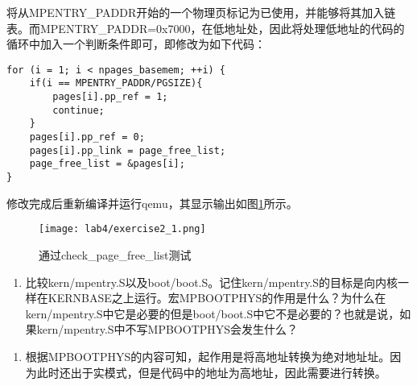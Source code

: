 \begin{exerciseSolution}{2}
    \par 将从MPENTRY\_PADDR开始的一个物理页标记为已使用，并能够将其加入链表。而MPENTRY\_PADDR=0x7000，在低地址处，因此将处理低地址的代码的循环中加入一个判断条件即可，即修改为如下代码：
    \begin{lstlisting}
for (i = 1; i < npages_basemem; ++i) {
    if(i == MPENTRY_PADDR/PGSIZE){
        pages[i].pp_ref = 1;
        continue;
    }
    pages[i].pp_ref = 0;
    pages[i].pp_link = page_free_list;
    page_free_list = &pages[i];
}
    \end{lstlisting}
    \par 修改完成后重新编译并运行qemu，其显示输出如图\ref{fig:lab4/exercise2_1}所示。
    \begin{figure}[htb]
        \centering
        \texttt{[image: lab4/exercise2\_1.png]}
        \caption{通过check\_page\_free\_list测试}
        \label{fig:lab4/exercise2_1}
    \end{figure}
\end{exerciseSolution}

\begin{questionEnv}
    \begin{enumerate}
        \item 比较kern/mpentry.S以及boot/boot.S。记住kern/mpentry.S的目标是向内核一样在KERNBASE之上运行。宏MPBOOTPHYS的作用是什么？为什么在kern/mpentry.S中它是必要的但是boot/boot.S中它不是必要的？也就是说，如果kern/mpentry.S中不写MPBOOTPHYS会发生什么？
    \end{enumerate}
\end{questionEnv}
\begin{answer}
    \begin{enumerate}
        \item 根据MPBOOTPHYS的内容可知，起作用是将高地址转换为绝对地址址。因为此时还出于实模式，但是代码中的地址为高地址，因此需要进行转换。
    \end{enumerate}
\end{answer}

